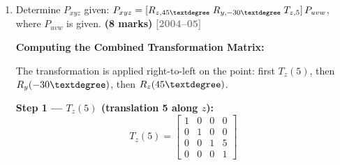 \documentclass[12pt,a3paper]{article}
\newcommand{\yr}[1]{\hfill\textcolor{gray}{\small\textbf{[#1]}}}
\newcommand{\mk}[1]{\textcolor{orange!70!black}{\small\textbf{(#1 marks)}}}
\begin{document}
\begin{enumerate}
\begin{tcolorbox}[enhanced,breakable,ansbox,colback=cB!4,colframe=cB,
  boxrule=0.8pt,arc=5pt,
  title={\textbf{Answer}},fonttitle=\bfseries\color{white},
  colbacktitle=cB]
\begin{enumerate}[leftmargin=*,label=\textbf{Step \arabic*:}]
  \item $T \leftarrow R_x(-\alpha)\cdot T$ \hfill(pre)
  \item $T \leftarrow R_z(-\beta)\cdot T$ \hfill(pre)
  \item $T \leftarrow T\cdot R_x(+\alpha)$ \hfill(post)
  \item $T \leftarrow T\cdot R_y(+\beta)$ \hfill(post)
  \item $T \leftarrow R_y(+\alpha)\cdot T$ \hfill(pre)
  \item $T \leftarrow \mathrm{Trans}(0,d_y,0)\cdot T$ \hfill(pre)
  \item $T \leftarrow T\cdot R_z(-\alpha)$ \hfill(post)
  \item $T \leftarrow \mathrm{Trans}(-d_x,0,0)\cdot T$ \hfill(pre)
\end{enumerate}

\textbf{Final combined equation:}
\[
  \boxed{
    T = \mathrm{Trans}(-d_x,0,0)\cdot\mathrm{Trans}(0,d_y,0)\cdot R_y(\alpha)
      \cdot R_z(-\beta)\cdot R_x(-\alpha)
      \cdot R_x(\alpha)\cdot R_y(\beta)\cdot R_z(-\alpha)
  }
\]

Note: $R_z(-\beta)\cdot R_x(-\alpha)\cdot R_x(\alpha) =
R_z(-\beta)\cdot I = R_z(-\beta)$, so:
\[
  \boxed{
    T = \mathrm{Trans}(-d_x,0,0)\cdot\mathrm{Trans}(0,d_y,0)\cdot R_y(\alpha)
      \cdot R_z(-\beta)\cdot R_y(\beta)\cdot R_z(-\alpha)
  }
\]

\end{tcolorbox}

\item \label{qlabel:C2-Q11}
Determine $P_{xyz}$ given:
$P_{xyz} = [R_{z,45\textdegree}\;R_{y,-30\textdegree}\;T_{z,5}]\,P_{uvw}$,
where $P_{uvw}$ is given. \mk{8}
\yr{2004--05}

\begin{tcolorbox}[enhanced,breakable,ansbox,colback=cB!4,colframe=cB,
  boxrule=0.8pt,arc=5pt,
  title={\textbf{Answer}},fonttitle=\bfseries\color{white},
  colbacktitle=cB]

\textbf{Computing the Combined Transformation Matrix:}

The transformation is applied right-to-left on the point:
first $T_z(5)$, then $R_y(-30\textdegree)$, then $R_z(45\textdegree)$.

\textbf{Step 1 — $T_z(5)$ (translation 5 along $z$):}
\[
  T_z(5) =
  \begin{bmatrix}1&0&0&0\\0&1&0&0\\0&0&1&5\\0&0&0&1\end{bmatrix}
\]


\end{tcolorbox}
\end{enumerate}
\end{document}
